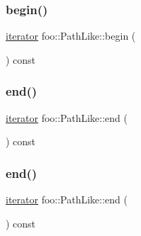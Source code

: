 \mbox{\label{classfoo_1_1_path_like_a7ca8b63139fd6fcada55fbf13ccf9c83}} 
\subsubsection{\texorpdfstring{begin()}{begin()}\hspace{0.1cm}{\footnotesize\ttfamily [3/3]}}
{\footnotesize\ttfamily \mbox{\hyperlink{structfoo_1_1_path_like_1_1iterator}{iterator}} foo\+::\+Path\+Like\+::begin (\begin{DoxyParamCaption}{ }\end{DoxyParamCaption}) const\hspace{0.3cm}{\ttfamily [inline]}}

\mbox{\label{classfoo_1_1_path_like_aca85cd005890f1d19f416ca7e2c95f02}} 
\subsubsection{\texorpdfstring{end()}{end()}\hspace{0.1cm}{\footnotesize\ttfamily [1/3]}}
{\footnotesize\ttfamily \mbox{\hyperlink{structfoo_1_1_path_like_1_1iterator}{iterator}} foo\+::\+Path\+Like\+::end (\begin{DoxyParamCaption}{ }\end{DoxyParamCaption}) const\hspace{0.3cm}{\ttfamily [inline]}}

\mbox{\label{classfoo_1_1_path_like_aca85cd005890f1d19f416ca7e2c95f02}} 
\subsubsection{\texorpdfstring{end()}{end()}\hspace{0.1cm}{\footnotesize\ttfamily [2/3]}}
{\footnotesize\ttfamily \mbox{\hyperlink{structfoo_1_1_path_like_1_1iterator}{iterator}} foo\+::\+Path\+Like\+::end (\begin{DoxyParamCaption}{ }\end{DoxyParamCaption}) const\hspace{0.3cm}{\ttfamily [inline]}}

